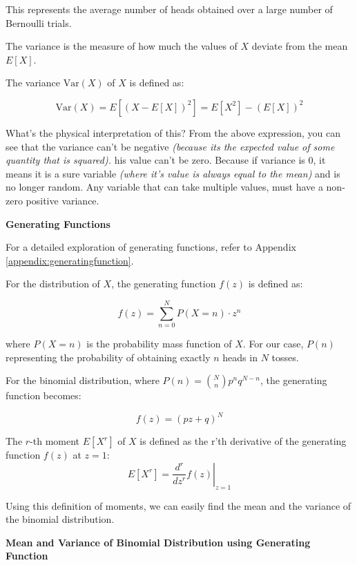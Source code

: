 This represents the average number of heads obtained over a large number of Bernoulli trials.

\begin{definition}
    The variance is the measure of how much the values of $X$ deviate from the mean $E[X]$.
\end{definition}

The variance \( \text{Var}(X) \) of \( X \) is defined as:

\[
    \text{Var}(X) = E[(X - E[X])^2] = E[X^2] - (E[X])^2
\]

What's the physical interpretation of this? From the above expression, you can see that the variance can't be negative \textit{(because its the expected value of some quantity that is squared).} his value can't be zero. Because if variance is 0, it means it is a sure variable \textit{(where it's value is always equal to the mean)} and is no longer random. Any variable that can take multiple values, must have a non-zero positive variance.

\vspace{8pt}
\textbf{Generating Functions}

\begin{important}
    For a detailed exploration of generating functions, refer to Appendix \ref{appendix:generatingfunction}.
\end{important}

For the distribution of $X$, the generating function $f(z)$ is defined as:

\[ f(z) = \sum_{n=0}^{N} P(X = n) \cdot z^n \]

where $P(X = n)$ is the probability mass function of $X$. For our case, $P(n)$ representing the probability of obtaining exactly $n$ heads in $N$ tosses.

For the binomial distribution, where $P(n) = \binom{N}{n} p^n q^{N-n}$, the generating function becomes:

\[ f(z) = (pz + q)^N \]

\begin{definition}
    The \( r \)-th moment \( E[X^r] \) of \( X \) is defined as the r'th derivative of the generating function \( f(z) \) at \( z = 1 \):
    \[ E[X^r] = \left. \frac{d^r}{dz^r} f(z) \right|_{z=1} \]
\end{definition}

Using this definition of moments, we can easily find the mean and the variance of the binomial distribution.

\vspace{8pt}
\textbf{Mean and Variance of Binomial Distribution using Generating Function}


